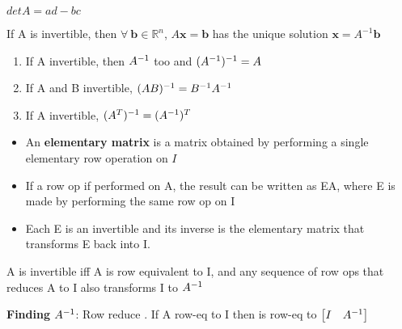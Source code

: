 \documentclass{report}
\begin{document}
$det A = ad - bc$

\begin{theorem}
    If A is invertible, then $\forall \ \mathbf{b} \in \mathbb{R}^n$, 
    $A\mathbf{x} = \mathbf{b}$  
    has the unique solution $\mathbf{x} = A^{-1}\mathbf{b}$
\end{theorem}
\vspace{1cm}
\begin{theorem}
\begin{enumerate}
    \item If A invertible, then $A^{-1}$ too and $(A^{-1})^{-1} = A$
    \item If A and B invertible, $(AB)^{-1} = B^{-1}A^{-1}$
    \item If A invertible, $(A^T)^{-1} = (A^{-1})^T$
\end{enumerate}
\end{theorem}

\begin{itemize}
    \item An \textbf{elementary matrix} is a matrix obtained by performing a single 
elementary row operation on $I$
    \item If a row op if performed on A, the result can be written as EA, where E is made
    by performing the same row op on I
    \item Each E is an invertible and its inverse is the elementary matrix that transforms E back into I. 
\end{itemize}

\begin{theorem}
    A is invertible iff A is row equivalent to I, and any sequence of row ops that reduces A 
    to I also transforms I to $A^{-1}$
\end{theorem}

\textbf{Finding }$A^{-1}$: Row reduce \matAI. If A row-eq to I then \matAI is row-eq to
$\begin{bmatrix}I & A^{-1}\end{bmatrix}$
\end{document}
